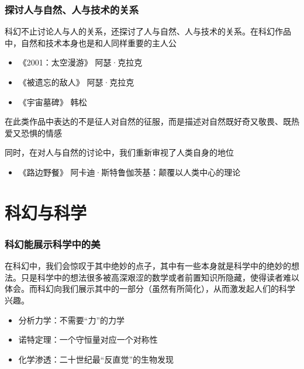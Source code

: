 \begin{frame}
  \frametitle{探讨人与自然、人与技术的关系}
  科幻不止讨论人与人的关系，还探讨了人与自然、人与技术的关系。在科幻作品中，自然和技术本身也是和人同样重要的主人公
  
  \vspace{0.4cm}
  
  \begin{minipage}[c]{0.5\textwidth}
  \begin{itemize}
    \item \alert{《2001：太空漫游》} 阿瑟·克拉克
    \item \alert{《被遗忘的敌人》} 阿瑟·克拉克
    \item \alert{《宇宙墓碑》} 韩松
  \end{itemize}
  \end{minipage}
  \hfill
  \begin{minipage}[c]{0.45\textwidth}
    \begin{noteBlock}
      在此类作品中表达的不是征人对自然的征服，而是描述对自然既好奇又敬畏、既热爱又恐惧的情感
    \end{noteBlock}
  \end{minipage}
  
  \vspace{0.4cm}

  同时，在对人与自然的讨论中，我们重新审视了人类自身的地位
  
  \begin{itemize}
    \item \alert{《路边野餐》} 阿卡迪·斯特鲁伽茨基：颠覆以人类中心的理论
  \end{itemize}
\end{frame}

\section{科幻与科学}

\begin{frame}
  \frametitle{科幻能展示科学中的美}
  在科幻中，我们会惊叹于其中绝妙的点子，其中有一些本身就是科学中的绝妙的想法。只是科学中的想法很多被高深艰涩的数学或者前置知识所隐藏，使得读者难以体会。而科幻向我们展示其中的一部分（虽然有所简化），从而激发起人们的科学兴趣。
  
  \vspace{0.4cm}

  \begin{itemize}
    \item \alert{分析力学}：不需要“力”的力学
    \item \alert{诺特定理}：一个守恒量对应一个对称性
    \item \alert{化学渗透}：二十世纪最“反直觉”的生物发现
  \end{itemize}
  \vspace{0.4cm}
\end{frame}

